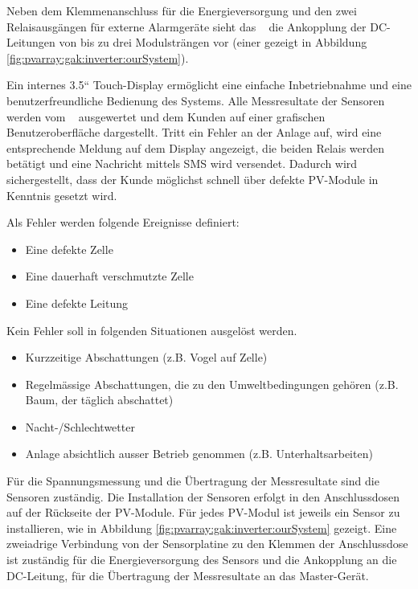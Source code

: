 Neben  dem   Klemmenanschluss  f\"ur   die  Energieversorgung  und   den  zwei
Relaisausg\"angen  f\"ur   externe  Alarmger\"ate   sieht  das   \Master~  die
Ankopplung der DC-Leitungen von bis zu drei Modulstr\"angen vor (einer gezeigt
in Abbildung \ref{fig:pvarray:gak:inverter:ourSystem}).

Ein internes  3.5“ Touch-Display  erm\"oglicht eine  einfache Inbetriebnahme
und  eine benutzerfreundliche  Bedienung des  Systems. Alle Messresultate  der
Sensoren werden vom  \Master~ ausgewertet und dem Kunden  auf einer grafischen
Benutzeroberfl\"ache  dargestellt. Tritt ein  Fehler an  der Anlage  auf, wird
eine entsprechende Meldung auf dem Display angezeigt, die beiden Relais werden
bet\"atigt  und  eine  Nachricht  mittels  SMS  wird  versendet. Dadurch  wird
sichergestellt, dass der Kunde m\"oglichst schnell \"uber defekte PV-Module in
Kenntnis gesetzt wird.

Als Fehler werden folgende Ereignisse definiert:
\begin{itemize}
    \firmlist
    \item
        Eine defekte Zelle
    \item
        Eine dauerhaft verschmutzte Zelle
    \item
        Eine defekte Leitung
\end{itemize}

Kein Fehler soll in folgenden Situationen ausgel\"ost werden.
\begin{itemize}
    \firmlist
    \item
        Kurzzeitige Abschattungen (z.B. Vogel auf Zelle)
    \item
        Regelm\"assige Abschattungen,  die zu den  Umweltbedingungen geh\"oren
        (z.B. Baum, der t\"aglich abschattet)
    \item
        Nacht-/Schlechtwetter
    \item
        Anlage absichtlich ausser Betrieb genommen (z.B. Unterhaltsarbeiten)
\end{itemize}

F\"ur   die  Spannungsmessung   und   die   \"Ubertragung  der   Messresultate
sind  die   Sensoren  zust\"andig. Die   Installation  der   Sensoren  erfolgt
in  den   Anschlussdosen  auf  der  R\"uckseite   der  PV-Module. F\"ur  jedes
PV-Modul  ist   jeweils  ein   Sensor  zu   installieren,  wie   in  Abbildung
\ref{fig:pvarray:gak:inverter:ourSystem}  gezeigt. Eine  zweiadrige Verbindung
von der Sensorplatine  zu den Klemmen der Anschlussdose  ist zust\"andig f\"ur
die Energieversorgung des Sensors und  die Ankopplung an die DC-Leitung, f\"ur
die \"Ubertragung der Messresultate an das Master-Ger\"at.


